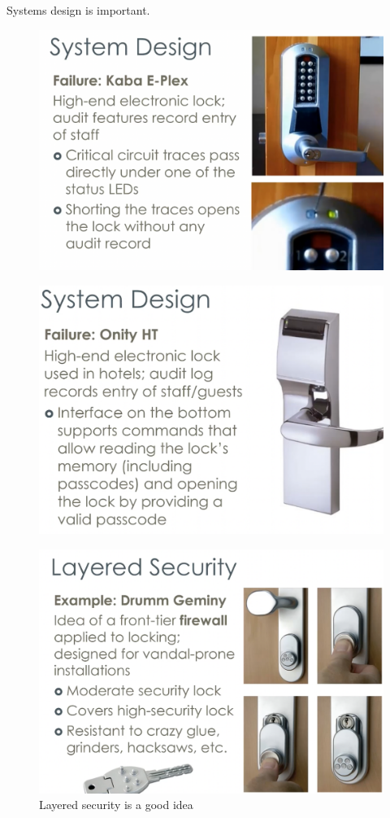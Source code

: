 \documentclass[../notes.tex]{subfiles}
\begin{document}
Systems design is important.

\begin{figure}[H]
    \centering
    \includegraphics[width=0.8\linewidth]{img/image_2023-04-16-21-17-10.png}
\end{figure}

\begin{figure}[H]
    \centering
    \includegraphics[width=0.8\linewidth]{img/image_2023-04-16-21-17-45.png}
\end{figure}



\begin{figure}[H]
    \centering
    \includegraphics[width=0.8\linewidth]{img/image_2023-04-16-21-18-14.png}
    \caption{Layered security is a good idea}
\end{figure}
\end{document}

